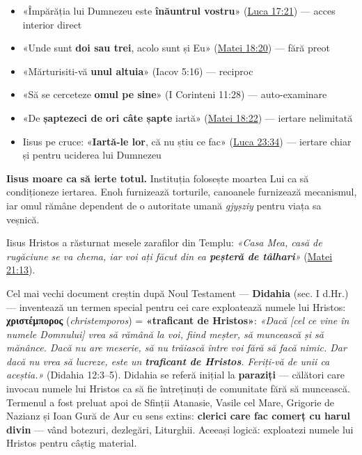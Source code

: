 \documentclass[12pt,a4paper,twoside,openany]{book}
\begin{document}
\begin{itemize}
  \item «Împărăția lui Dumnezeu este \textbf{înăuntrul vostru}» (\href{https://bibliaortodoxa.ro/carte.php?id=48\&cap=17\#21}{Luca 17:21}) — acces interior direct
  \item «Unde sunt \textbf{doi sau trei}, acolo sunt și Eu» (\href{https://bibliaortodoxa.ro/carte.php?id=55\&cap=18\#20}{Matei 18:20}) — fără preot
  \item «Mărturisiti-vă \textbf{unul altuia}» (Iacov 5:16) — reciproc
  \item «Să se cerceteze \textbf{omul pe sine}» (I Corinteni 11:28) — auto-examinare
  \item «De \textbf{șaptezeci de ori câte șapte} iartă» (\href{https://bibliaortodoxa.ro/carte.php?id=55\&cap=18\#22}{Matei 18:22}) — iertare nelimitată
  \item Iisus pe cruce: «\textbf{Iartă-le lor}, că nu știu ce fac» (\href{https://bibliaortodoxa.ro/carte.php?id=48\&cap=23\#34}{Luca 23:34}) — iertare chiar și pentru uciderea lui Dumnezeu
\end{itemize}
\textbf{Iisus moare ca să ierte totul.} Instituția folosește moartea Lui ca să condiționeze iertarea. Enoh furnizează torturile, canoanele furnizează mecanismul, iar omul rămâne dependent de o autoritate umană \textit{gjyșziy} pentru viața sa veșnică.

Iisus Hristos a răsturnat mesele zarafilor din Templu: \textit{«Casa Mea, casă de rugăciune se va chema, iar voi ați făcut din ea \textbf{peșteră de tâlhari}»} (\href{https://bibliaortodoxa.ro/carte.php?id=55\&cap=21\#13}{Matei 21:13}).

Cel mai vechi document creștin după Noul Testament — \textbf{Didahia} (sec. I d.Hr.) — inventează un termen special pentru cei care exploatează numele lui Hristos: \textbf{χριστέμπορος} (\textit{christemporos}) = \textbf{«traficant de Hristos»}: \textit{«Dacă [cel ce vine în numele Domnului] vrea să rămână la voi, fiind meșter, să muncească și să mănânce. Dacă nu are meserie, să nu trăiască între voi fără să facă nimic. Dar dacă nu vrea să lucreze, este un \textbf{traficant de Hristos}. Feriți-vă de unii ca aceștia.»} (Didahia 12:3–5). Didahia se referă inițial la \textbf{paraziți} — călători care invocau numele lui Hristos ca să fie întreținuți de comunitate fără să muncească. Termenul a fost preluat apoi de Sfinții Atanasie, Vasile cel Mare, Grigorie de Nazianz și Ioan Gură de Aur cu sens extins: \textbf{clerici care fac comerț cu harul divin} — vând botezuri, dezlegări, Liturghii. Aceeași logică: exploatezi numele lui Hristos pentru câștig material.
\end{document}
